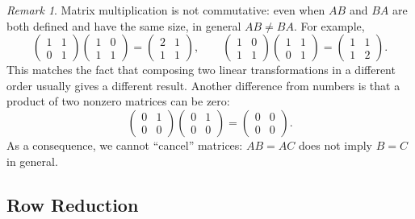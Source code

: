 \documentclass[11pt]{article}
\theoremstyle{definition}
\theoremstyle{plain}
\theoremstyle{remark}
\newtheorem{remark}[definition]{Remark}
\begin{document}
\begin{remark}\label{rem:noncommutative}
    Matrix multiplication is not commutative: even when $AB$ and $BA$ are both defined and have the same size, in general $AB \neq BA$. For example,
    \[\begin{pmatrix}
        1 & 1 \\
        0 & 1
    \end{pmatrix} \begin{pmatrix}
        1 & 0 \\
        1 & 1
    \end{pmatrix} = \begin{pmatrix}
        2 & 1 \\
        1 & 1
    \end{pmatrix}, \qquad \begin{pmatrix}
        1 & 0 \\
        1 & 1
    \end{pmatrix} \begin{pmatrix}
        1 & 1 \\
        0 & 1
    \end{pmatrix} = \begin{pmatrix}
        1 & 1 \\
        1 & 2
    \end{pmatrix}.\]
    This matches the fact that composing two linear transformations in a different order usually gives a different result. Another difference from numbers is that a product of two nonzero matrices can be zero:
    \[\begin{pmatrix}
        0 & 1 \\
        0 & 0
    \end{pmatrix} \begin{pmatrix}
        0 & 1 \\
        0 & 0
    \end{pmatrix} = \begin{pmatrix}
        0 & 0 \\
        0 & 0
    \end{pmatrix}.\]
    As a consequence, we cannot ``cancel'' matrices: $AB = AC$ does not imply $B = C$ in general.
\end{remark}

\subsection{Row Reduction}
\end{document}
